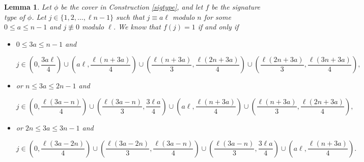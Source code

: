 \documentclass{article}
\newtheorem{lemma}[theorem]{Lemma}
\theoremstyle{remark}
\theoremstyle{definition}
\begin{document}
\begin{lemma}
    \label{intervals}
    Let $\phi$ be the cover in Construction \ref{sigtype}, and let $f$ be the signature type of $\phi$. Let $j \in \{1,2,\ldots,\ell n-1\}$ such that $j \equiv a\ell$ modulo $n$ for some $0 \leq a \leq n-1$ and $j \not \equiv 0$ modulo $\ell$. We know that $f(j) = 1$ if and only if
    \begin{itemize}

   
    \item $0 \leq 3a \leq n-1$ and
    
    \[
        j \in \left(0, \frac{3a\ell}{4}\right) \cup \left(a\ell, \frac{\ell(n+3a)}{4} \right) \cup \left(\frac{\ell(n+3a)}{3}, \frac{\ell(2n+3a)}{4} \right) \cup \left(\frac{\ell(2n+3a)}{3}, \frac{\ell(3n+3a)}{4} \right),
    \]
    
    \item or $n \leq 3a \leq 2n-1$ and

    \[
        j \in \left(0, \frac{\ell(3a-n)}{4}\right) \cup \left(\frac{\ell(3a-n)}{3}, \frac{3\ell a}{4} \right) \cup  \left(a\ell, \frac{\ell(n+3a)}{4} \right) \cup  \left(\frac{\ell(n+3a)}{3}, \frac{\ell(2n+3a)}{4} \right),
    \]
    
    \item or $2n \leq 3a \leq 3n-1$ and
   
    \[
       j \in \left(0, \frac{\ell(3a-2n)}{4}\right) \cup \left(\frac{\ell(3a-2n)}{3}, \frac{\ell(3a-n)}{4} \right) \cup  \left(\frac{\ell(3a-n)}{3}, \frac{3\ell a}{4} \right) \cup  \left(a\ell, \frac{\ell(n+3a)}{4} \right).
    \]
     \end{itemize}
\end{lemma}
\end{document}
